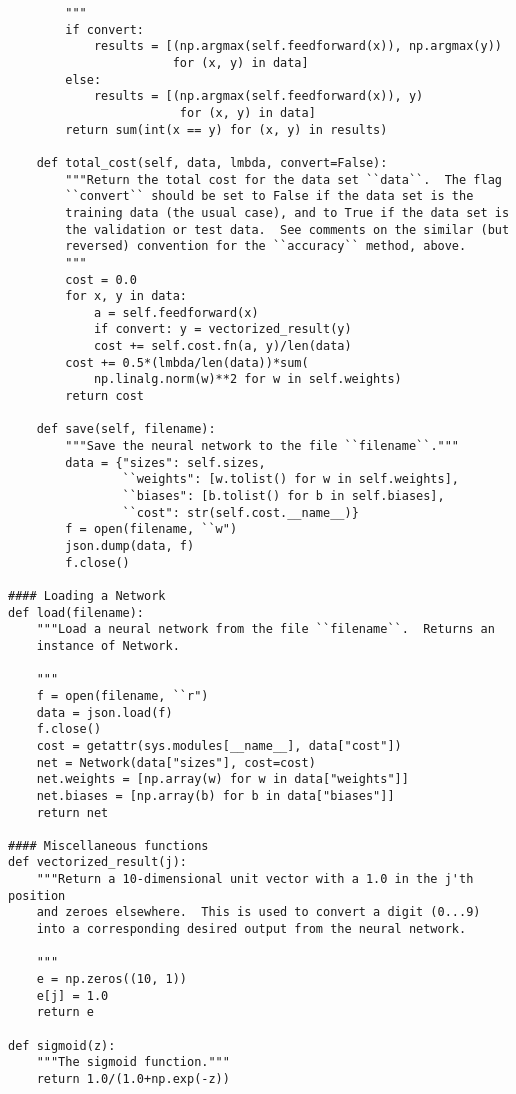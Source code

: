 \begin{lstlisting}
        """
        if convert:
            results = [(np.argmax(self.feedforward(x)), np.argmax(y))
                       for (x, y) in data]
        else:
            results = [(np.argmax(self.feedforward(x)), y)
                        for (x, y) in data]
        return sum(int(x == y) for (x, y) in results)

    def total_cost(self, data, lmbda, convert=False):
        """Return the total cost for the data set ``data``.  The flag
        ``convert`` should be set to False if the data set is the
        training data (the usual case), and to True if the data set is
        the validation or test data.  See comments on the similar (but
        reversed) convention for the ``accuracy`` method, above.
        """
        cost = 0.0
        for x, y in data:
            a = self.feedforward(x)
            if convert: y = vectorized_result(y)
            cost += self.cost.fn(a, y)/len(data)
        cost += 0.5*(lmbda/len(data))*sum(
            np.linalg.norm(w)**2 for w in self.weights)
        return cost

    def save(self, filename):
        """Save the neural network to the file ``filename``."""
        data = {"sizes": self.sizes,
                ``weights": [w.tolist() for w in self.weights],
                ``biases": [b.tolist() for b in self.biases],
                ``cost": str(self.cost.__name__)}
        f = open(filename, ``w")
        json.dump(data, f)
        f.close()

#### Loading a Network
def load(filename):
    """Load a neural network from the file ``filename``.  Returns an
    instance of Network.

    """
    f = open(filename, ``r")
    data = json.load(f)
    f.close()
    cost = getattr(sys.modules[__name__], data["cost"])
    net = Network(data["sizes"], cost=cost)
    net.weights = [np.array(w) for w in data["weights"]]
    net.biases = [np.array(b) for b in data["biases"]]
    return net

#### Miscellaneous functions
def vectorized_result(j):
    """Return a 10-dimensional unit vector with a 1.0 in the j'th position
    and zeroes elsewhere.  This is used to convert a digit (0...9)
    into a corresponding desired output from the neural network.

    """
    e = np.zeros((10, 1))
    e[j] = 1.0
    return e

def sigmoid(z):
    """The sigmoid function."""
    return 1.0/(1.0+np.exp(-z))


\end{lstlisting}
